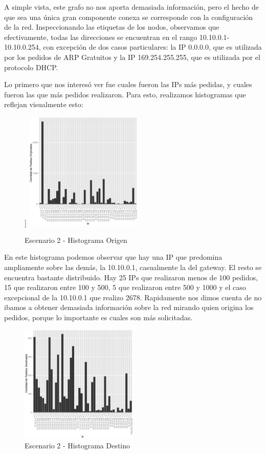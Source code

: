     A simple vista, este grafo no nos aporta demasiada información, pero el hecho de que sea una única gran componente conexa se corresponde con la configuración de la red. Inspeccionando las etiquetas de los nodos, observamos que efectivamente, todas las direcciones se encuentran en el rango 10.10.0.1-10.10.0.254, con excepción de dos casos particulares: la IP 0.0.0.0, que es utilizada por los pedidos de ARP Gratuitos\cite{wireshark}\cite{rfc826} y la IP 169.254.255.255, que es utilizada por el protocolo DHCP.
    \par Lo primero que nos interesó ver fue cuales fueron las IPs más pedidas, y cuales fueron las que más pedidos realizaron. Para esto, realizamos histogramas que reflejan visualmente esto:
\begin{figure}[!h]]
		\centering
		\includegraphics[width=0.5\textwidth]{img/graph/escenario_2/histogramSrc.eps}
		\caption{Escenario 2 - Histograma Origen}
		\label{fig:escenario2_histogramaSrc}
	\end{figure}       
    En este histograma podemos observar que hay una IP que predomina ampliamente sobre las demás, la 10.10.0.1, casualmente la del gateway. El resto se encuentra bastante distribuido. Hay 25 IPs que realizaron menos de 100 pedidos, 15 que realizaron entre 100 y 500, 5 que realizaron entre 500 y 1000 y el caso excepcional de la 10.10.0.1 que realizo 2678. Rapidamente nos dimos cuenta de no ibamos a obtener demasiada información sobre la red mirando quien origina los pedidos, porque lo importante es cuales son más solicitadas.
       
    \begin{figure}[!h]
		\centering
		\includegraphics[width=0.5\textwidth]{img/graph/escenario_2/histogramDst.eps}
		\caption{Escenario 2 - Histograma Destino}
		\label{fig:escenario2_histogramaDst}
	\end{figure}
            
